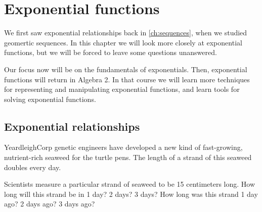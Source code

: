 \chapter{Exponential functions}
\label{ch:expofunc}


We first saw exponential relationships back in \cref{ch:sequences}, when we studied geomertic sequences. In this chapter we will look more closely at exponential functions, but we will be forced to leave some questions unanswered.

Our focus now will be on the fundamentals of exponentials. Then, exponential functions will return in Algebra 2. In that course we will learn more techniques for representing and manipulating exponential functions, and learn tools for solving exponential functions.

%

\section{Exponential relationships}
\label{sec:exporelationships}

\begin{boxexplore}
YeardleighCorp genetic engineers have developed a new kind of fast-growing, nutrient-rich seaweed for the turtle pens. The length of a strand of this seaweed doubles every day.

Scientists measure a particular strand of seaweed to be 15 centimeters long. How long will this strand be in 1 day? 2 days? 3 days? How long was this strand 1 day ago? 2 days ago? 3 days ago?
\end{boxexplore}

